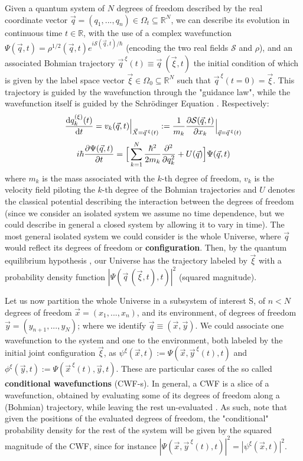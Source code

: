\documentclass[11pt, a4paper]{article} %
\newcommand{\R}{\mathbb{R}} %
\begin{document}
Given a quantum system of $N$ degrees of freedom described by the real coordinate vector $\vec{q}=(q_1,..., q_n)\in\Omega_t\subseteq\R^N$, we can describe its evolution in continuous time $t\in\R$, with the use of a complex wavefunction $\Psi(\vec{q},t)=\rho^{1/2}(\vec{q},t)e^{i\mathcal{S}(\vec{q},t)/\hbar}$ (encoding the two real fields $\mathcal{S}$ and $\rho$), and an associated Bohmian trajectory $\vec{q}^{\:\xi}(t)\equiv \vec{q}\:(\vec{\xi},t)$ the initial condition of which is given by the label space vector $\vec{\xi}\in\Omega_0\subseteq\R^N$ such that $\vec{q}^{\:\xi}(t=0)=\vec{\xi}$. This trajectory is guided by the wavefunction through the "guidance law", while the wavefunction itself is guided by the Schrödinger Equation \cite{Bohm,Holland,Durr,JordiXavier}. Respectively:\vspace{-0.2cm}
\begin{equation}\label{GL}
\dv{q_k^{ (\xi)}(t)}{t} = v_k(\vec{q},t)\Big\rvert_{\vec{X}=\vec{q}^{\:\xi}(t)}:=\frac{1}{m_k} \pdv{\mathcal{S}(\vec{q},t)}{x_k}\Big\rvert_{\vec{q}=\vec{q}^{\:\xi}(t)}
\end{equation}
\begin{equation}\label{SE}
i\hbar\pdv{\Psi(\vec{q},t)}{t}=\Big[ \sum_{k=1}^N \frac{\hbar^2}{2m_k}\pdv[2]{}{q_k}+U(\vec{q})\Big]\Psi(\vec{q},t)
\end{equation}
where $m_k$ is the mass associated with the $k$-th degree of freedom, $v_k$ is the velocity field piloting the $k$-th degree of the Bohmian trajectories and $U$ denotes the classical potential describing the interaction between the degrees of freedom (since we consider an isolated system we assume no time dependence, but we could describe in general a closed system by allowing it to vary in time). The most general isolated system we could consider is the whole Universe, where $\vec{q}$ would reflect its degrees of freedom or {\bf configuration}. Then, by the quantum equilibrium hypothesis \cite{Absolute}, our Universe has the trajectory labeled by $\vec{\xi}$ with a probability density function $|\Psi(\vec{q}\,(\vec{\xi},t),t)|^2$ (squared magnitude). 

Let us now partition the whole Universe in a subsystem of interest S, of $n<N$ degrees of freedom $\vec{x}=(x_1,...,x_n)$, and its environment, of degrees of freedom $\vec{y}=(y_{n+1},...,y_N)$; where we identify $\vec{q}\equiv (\vec{x},\vec{y})$. We could associate one wavefunction to the system and one to the environment, both labeled by the initial joint configuration $\vec{\xi}$, as $\psi^\xi(\vec{x},t):=\Psi(\vec{x},\vec{y}^{\:\xi}(t),t)$ and $\phi^\xi(\vec{y},t):=\Psi(\vec{x}^{\:\xi}(t),\vec{y},t)$. These are particular cases of the so called {\bf conditional wavefunctions} (CWF-s). In general, a CWF is a slice of a wavefunction, obtained by evaluating some of its degrees of freedom along a (Bohmian) trajectory, while leaving the rest un-evaluated \cite{Absolute, JordiXavier}. As such, note that given the positions of the evaluated degrees of freedom, the "conditional" probability density for the rest of the system will be given by the squared magnitude of the CWF, since for instance $|\Psi(\vec{x},\vec{y}^{\:\xi}(t), t)|^2=|\psi^\xi(\vec{x},t)|^2$.
\end{document}
